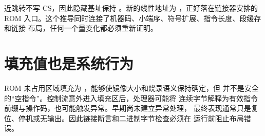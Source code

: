 近跳转不写 CS，因此隐藏基址保持 。新的线性地址为
，正好落在链接器安排的 ROM
入口。这个推导同时连接了机器码、小端序、符号扩展、指令长度、段缓存和链接
布局，任何一个量变化都必须重新证明。

\section{填充值也是系统行为}

ROM 未占用区域填充为 ，能够使镜像大小和烧录语义保持确定，但
 并不是安全的“空指令”。控制流意外进入填充区后，处理器可能将
连续字节解释为有效指令前缀与操作码，也可能触发异常。早期尚未建立异常处理，
最终表现通常只是复位、停机或无输出。因此链接断言和二进制字节检查必须在
运行前阻止布局错误。
